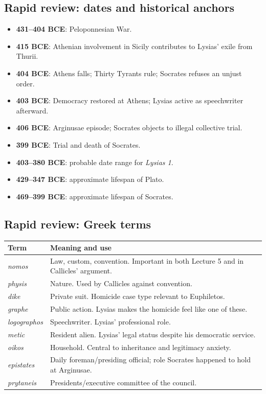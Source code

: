 \documentclass[11pt]{article}
\begin{document}
\subsection*{Rapid review: dates and historical anchors}
\begin{itemize}
\item \textbf{431--404 BCE}: Peloponnesian War.
\item \textbf{415 BCE}: Athenian involvement in Sicily contributes to Lysias' exile from Thurii.
\item \textbf{404 BCE}: Athens falls; Thirty Tyrants rule; Socrates refuses an unjust order.
\item \textbf{403 BCE}: Democracy restored at Athens; Lysias active as speechwriter afterward.
\item \textbf{406 BCE}: Arginusae episode; Socrates objects to illegal collective trial.
\item \textbf{399 BCE}: Trial and death of Socrates.
\item \textbf{403--380 BCE}: probable date range for \textit{Lysias 1}.
\item \textbf{429--347 BCE}: approximate lifespan of Plato.
\item \textbf{469--399 BCE}: approximate lifespan of Socrates.
\end{itemize}

\subsection*{Rapid review: Greek terms}

\begin{tabularx}{\linewidth}{@{}lX@{}}
\toprule
\textbf{Term} & \textbf{Meaning and use} \\
\midrule
\textit{nomos} & Law, custom, convention. Important in both Lecture 5 and in Callicles' argument. \\
\textit{physis} & Nature. Used by Callicles against convention. \\
\textit{dike} & Private suit. Homicide case type relevant to Euphiletos. \\
\textit{graphe} & Public action. Lysias makes the homicide feel like one of these. \\
\textit{logographos} & Speechwriter. Lysias' professional role. \\
\textit{metic} & Resident alien. Lysias' legal status despite his democratic service. \\
\textit{oikos} & Household. Central to inheritance and legitimacy anxiety. \\
\textit{epistates} & Daily foreman/presiding official; role Socrates happened to hold at Arginusae. \\
\textit{prytaneis} & Presidents/executive committee of the council. \\
\bottomrule
\end{tabularx}
\end{document}
